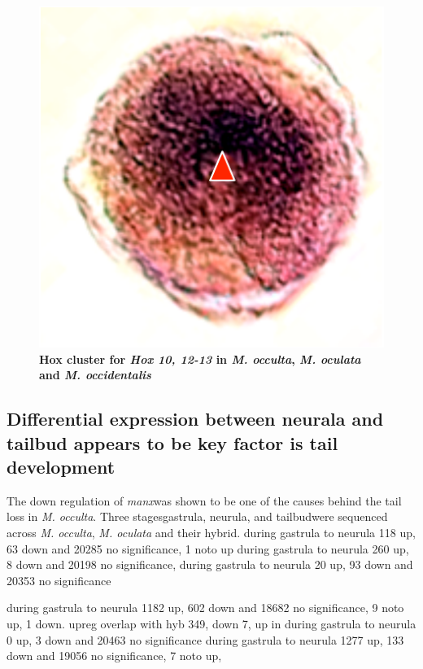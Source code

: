 \begin{figure}[tbp]
\centering
\includegraphics[scale=0.55]{figures/prickle.pdf}
\caption{\textbf{Hox cluster for \textit{Hox 10, 12-13} in \textit{M. occulta}, \textit{M. oculata} and \textit{M. occidentalis}} }
\label{fig:prickle}
\end{figure}



\subsection{Differential expression between neurala and tailbud appears to be key factor is tail development} 

The down regulation of \textit{manx}was shown to be one of the causes behind the tail loss  in \textit{M. occulta}. Three stages\textemdash gastrula, neurula, and tailbud\textemdash were sequenced across \textit{M. occulta}, \textit{M. oculata} and their hybrid. 
during gastrula to neurula 118 up, 63 down and 20285 no significance, 1 noto up 
during gastrula to neurula 260 up, 8 down and 20198 no significance,
during gastrula to neurula 20 up, 93 down and 20353 no significance



during gastrula to neurula 1182 up, 602 down and 18682 no significance, 9 noto up, 1 down. upreg overlap with hyb 349, down 7, up in 
during gastrula to neurula 0 up, 3 down and 20463 no significance
during gastrula to neurula 1277 up, 133 down and 19056 no significance, 7 noto up, 



